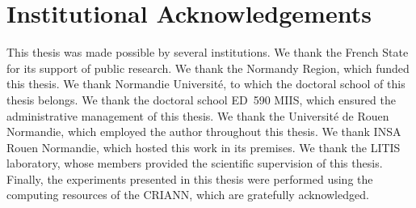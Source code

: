 \chapter*{Institutional Acknowledgements}
\label{chap:institutional_acknowledgements}

This thesis was made possible by several institutions.
We thank the French State for its support of public research.
We thank the Normandy Region, which funded this thesis.
We thank Normandie Université, to which the doctoral school of this thesis belongs.
We thank the doctoral school ED~590 MIIS, which ensured the administrative management of this thesis.
We thank the Université de Rouen Normandie, which employed the author throughout this thesis.
We thank INSA Rouen Normandie, which hosted this work in its premises.
We thank the LITIS laboratory, whose members provided the scientific supervision of this thesis.
Finally, the experiments presented in this thesis were performed using the computing resources of the CRIANN, which are gratefully acknowledged.


